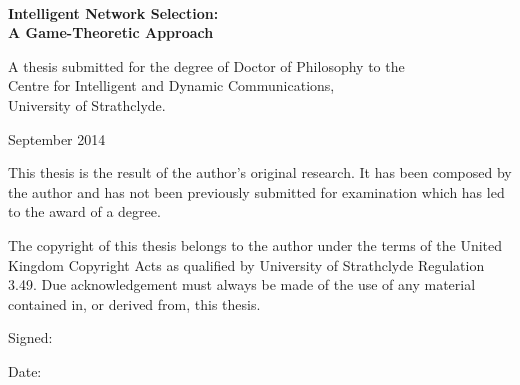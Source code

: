 \begin{titlepage}

\vspace*{2.2cm}

\\[1ex]
{\bf\sffamily\Huge Intelligent Network Selection:}\\[1ex]
{\bf\sffamily\Huge A Game-Theoretic Approach}

\par
\vspace{2cm}


\par
\vspace{6.5cm}

\noindent A thesis submitted for the degree of Doctor of Philosophy to the \\Centre for Intelligent and Dynamic Communications,\\ University of Strathclyde.

\par
\vspace{1cm}

\noindent September 2014

\cleardoublepage


\vspace*{2.2cm}

\noindent This thesis is the result of the author's original research. It has been composed by the author and has not been previously submitted for examination which has led to the award of a degree.

\par
\vspace{1em}

\noindent The copyright of this thesis belongs to the author under the terms of the United Kingdom Copyright Acts as qualified by University of Strathclyde Regulation 3.49. Due acknowledgement must always be made of the use of any material contained in, or derived from, this thesis.

\par
\vspace{1em}

\noindent Signed:

\par
\vspace{1em}

\noindent Date:

\cleardoublepage
\end{titlepage}